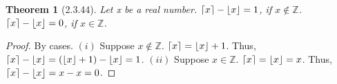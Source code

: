\documentclass[a4paper, 12pt]{article}
\theoremstyle{plain}
\newtheorem*{theorem*}{Theorem}
\DeclarePairedDelimiter{\floor}{\lfloor}{\rfloor}
\DeclarePairedDelimiter{\ceil}{\lceil}{\rceil}
\begin{document}
	
	\begin{theorem*}[2.3.44]
		Let x be a real number. $\ceil{x} - \floor{x} = 1$, if $x \notin \mathbb{Z}$. \newline 
		$\ceil{x} - \floor{x} = 0$, if $x \in \mathbb{Z}$. 
	\end{theorem*}
	
	\begin{proof}
		By cases. \newline \newline
		$(i)$ Suppose $x \notin \mathbb{Z}$. $\ceil{x} = \floor{x} + 1$. Thus, 
		$\ceil{x} - \floor{x} = (\floor{x} + 1) - \floor{x} = 1$. \newline \newline 
		$(ii)$ Suppose $x \in \mathbb{Z}$. $\ceil{x} = \floor{x} = x$. Thus, 
		$\ceil{x} - \floor{x} = x - x = 0$.
	\end{proof}
\end{document}
